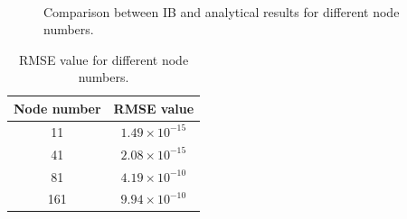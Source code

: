 \begin{figure}[H]
	\centering
	\quad
	\\
	\quad
	\caption{Comparison between IB and analytical results for different node numbers.}
	\label{fig:C3_ghostCell_nodeNumber}
\end{figure}

\begin{table}[H]
\centering
\begin{tabular}{c | c}
	 Node number & RMSE value \\ \hline \hline
	 11 & $1.49 \times 10^{-15}$ \\ \hline
	 41 & $2.08 \times 10^{-15}$ \\ \hline
	 81 & $4.19 \times 10^{-10}$ \\ \hline
	 161 & $9.94 \times 10^{-10}$ \\
\end{tabular}
\caption{RMSE value for different node numbers.}
\label{table:C3_ghostCell_nodeNumber_RMSE}
\end{table}


